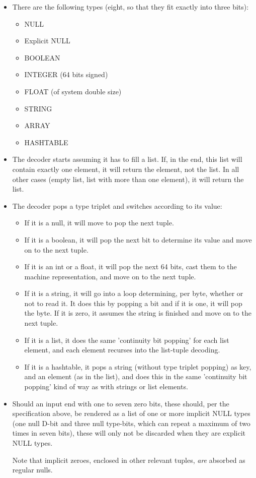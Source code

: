 \begin{itemize}
\item There are the following types (eight, so that they fit exactly
      into three bits):
  \begin{itemize}
  \item NULL
  \item Explicit NULL
  \item BOOLEAN
  \item INTEGER (64 bits signed)
  \item FLOAT (of system double size)
  \item STRING
  \item ARRAY
  \item HASHTABLE
  \end{itemize}

\item The decoder starts assuming it has to fill a list.
  If, in the end, this list will contain exactly one element, it will
  return the element, not the list. In all other cases (empty list,
  list with more than one element), it will return the list.

\item The decoder pops a type triplet and switches according to its value:
  \begin{itemize}
  \item If it is a null, it will move to pop the next tuple.
  \item If it is a boolean, it will pop the next bit to determine its value
        and move on to the next tuple.
  \item If it is an int or a float, it will pop the next 64 bits,
        cast them to the machine representation, and move on to the next tuple.
  \item If it is a string, it will go into a loop determining, per byte,
        whether or not to read it. It does this by popping a bit and if
        it is one, it will pop the byte. If it is zero, it assumes the
        string is finished and move on to the next tuple.
  \item If it is a list, it does the same 'continuity bit popping' for
        each list element, and each element recurses into the list-tuple
        decoding.
  \item If it is a hashtable, it pops a string (without type triplet popping)
        as key, and an element (as in the list), and does this in the same
        'continuity bit popping' kind of way as with strings or list elements.
  \end{itemize}

\item Should an input end with one to seven zero bits, these should, per the
  specification above, be rendered as a list of one or more implicit NULL types
  (one null D-bit and three null type-bits, which can repeat a maximum of
  two times in seven bits), these will only not be discarded when they
  are explicit NULL types.

  Note that implicit zeroes, enclosed in other relevant tuples, \textit{are}
  absorbed as regular nulls.
\end{itemize}

